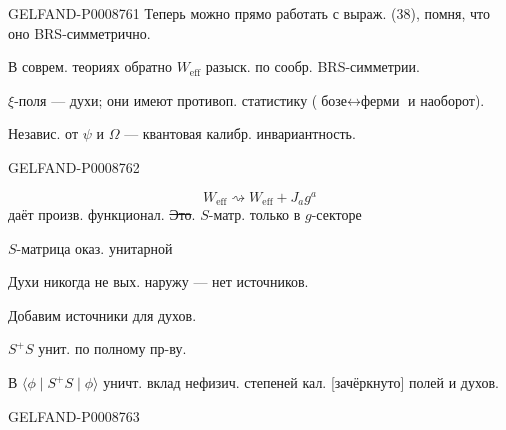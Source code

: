 \begin{GelfandAdjacentEvidence}{GELFAND-P000876}{1}
Теперь можно прямо работать с выраж. (38), помня, что оно BRS-симметрично.

В соврем. теориях обратно $W_{\mathrm{eff}}$ разыск. по сообр. BRS-симметрии.

$\xi$-поля --- духи; они имеют противоп. статистику ($\text{бозе}\leftrightarrow\text{ферми}$ и наоборот).

Независ. от $\psi$ и $\Omega$ --- квантовая калибр. инвариантность.

\end{GelfandAdjacentEvidence}
\begin{GelfandAdjacentEvidence}{GELFAND-P000876}{2}

\begin{equation*}
W_{\mathrm{eff}}\rightsquigarrow W_{\mathrm{eff}}+J_a g^a
\tag{46}
\end{equation*}
даёт произв. функционал. \sout{Это}. $S$-матр. только в $g$-секторе

$S$-матрица оказ. унитарной

Духи никогда не вых. наружу --- нет источников.

Добавим источники для духов.

$S^+S$ унит. по полному пр-ву.

В $\langle\phi\mid S^+S\mid\phi\rangle$ уничт. вклад нефизич. степеней кал. [зачёркнуто] полей и духов.
\end{GelfandAdjacentEvidence}
\begin{GelfandAdjacentEvidence}{GELFAND-P000876}{3}

\end{GelfandAdjacentEvidence}
